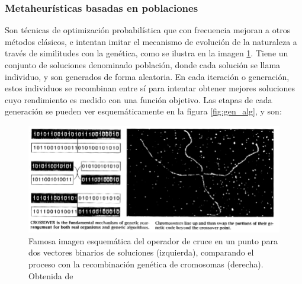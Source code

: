 \subsubsection{Metaheurísticas basadas en poblaciones}

Son técnicas de optimización probabilística que con frecuencia mejoran a otros métodos clásicos, e intentan imitar el mecanismo de evolución de la naturaleza a través de similitudes con la genética, como se ilustra en la imagen \ref{fig:cruce_mh}. Tiene un conjunto de soluciones denominado población, donde cada solución se llama individuo, y son generados de forma aleatoria. En cada iteración o generación, estos individuos se recombinan entre sí para intentar obtener mejores soluciones cuyo rendimiento es medido con una función objetivo. Las etapas de cada generación se pueden ver esquemáticamente en la figura \ref{fig:gen_alg}, y son:

\begin{figure}
    \centering
    \includegraphics[width=0.75\linewidth]{Plantilla_TFG_latex//imagenes//Inf//2.Fund/cruce_mh.png}
    \caption{Famosa imagen esquemática del operador de cruce en un punto para dos vectores binarios de soluciones (izquierda), comparando el proceso con la recombinación genética de cromosomas (derecha). Obtenida de \cite{holland_gen_alg}}
    \label{fig:cruce_mh}
\end{figure}


